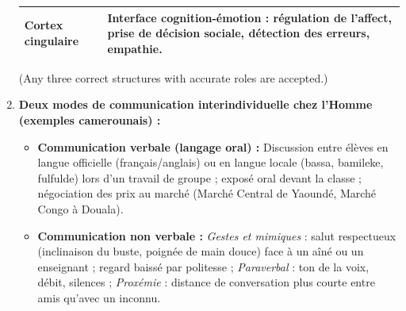 \documentclass[11pt]{article}
\begin{document}
\begin{corrige}
\begin{enumerate}
\begin{center}
\begin{tabularx}{\linewidth}{|l|X|}
\hline
Cortex cingulaire & Interface cognition-émotion : régulation de l'affect, prise de décision sociale, détection des erreurs, empathie. \\
\hline
\end{tabularx}
\end{center}
(Any three correct structures with accurate roles are accepted.)
\item \textbf{Deux modes de communication interindividuelle chez l'Homme (exemples camerounais) :}
\begin{itemize}
\item \textbf{Communication verbale (langage oral) :} Discussion entre élèves en langue officielle (français/anglais) ou en langue locale (bassa, bamileke, fulfulde) lors d'un travail de groupe ; exposé oral devant la classe ; négociation des prix au marché (Marché Central de Yaoundé, Marché Congo à Douala).
\item \textbf{Communication non verbale :} \emph{Gestes et mimiques} : salut respectueux (inclinaison du buste, poignée de main douce) face à un aîné ou un enseignant ; regard baissé par politesse ; \emph{Paraverbal} : ton de la voix, débit, silences ; \emph{Proxémie} : distance de conversation plus courte entre amis qu'avec un inconnu.
\end{itemize}
\end{enumerate}
\end{corrige}
\end{document}
